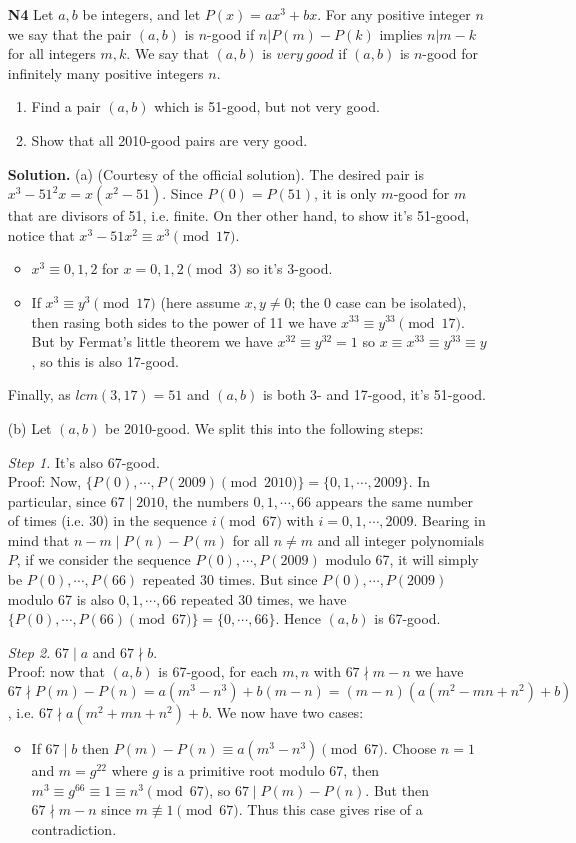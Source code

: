 \documentclass[11pt]{article}
\newcommand{\<}{\langle}
\renewcommand{\>}{\rangle}
\begin{document}
\begin{enumerate}
	\item [\textbf{N4}]Let $a, b$ be integers, and let $P(x) = ax^3+bx.$ For any positive integer $n$ we say that the pair $(a,b)$ is $n$-good if $n | P(m)-P(k)$ implies $n | m - k$ for all integers $m, k.$ We say that $(a,b)$ is $very \ good$ if $(a,b)$ is $n$-good for infinitely many positive integers $n.$
	\begin{enumerate}
		\item Find a pair $(a,b)$ which is 51-good, but not very good.
		\item Show that all 2010-good pairs are very good.
		\end{enumerate}
	
	\textbf{Solution.} 
	(a) (Courtesy of the official solution). The desired pair is $x^3-51^2x=x(x^2-51)$. Since $P(0)=P(51)$, it is only $m$-good for $m$ that are divisors of 51, i.e. finite. 
	On ther other hand, to show it's 51-good, notice that $x^3-51x^2\equiv x^3\pmod{17}$. 
	\begin{itemize}
		\item $x^3\equiv 0, 1, 2$ for $x=0, 1, 2\pmod{3}$ so it's 3-good. 
		\item If $x^3\equiv y^3\pmod{17}$ (here assume $x, y\neq 0$; the 0 case can be isolated), then rasing both sides to the power of 11 we have $x^{33}\equiv y^{33}\pmod{17}$. But by Fermat's little theorem we have $x^{32}\equiv y^{32}=1$ so $x\equiv x^{33}\equiv y^{33}\equiv y$, so this is also 17-good. 
	\end{itemize}
	Finally, as $lcm(3, 17)=51$ and $(a, b)$ is both 3- and 17-good, it's 51-good. 
	
	(b) Let $(a, b)$ be 2010-good. We split this into the following steps: 
	
	\emph{Step 1.} It's also 67-good. \\
	Proof: Now, $\{P(0), \cdots , P(2009) \pmod{2010}\}=\{0, 1, \cdots , 2009\}$. In particular, since $67\mid 2010$, the numbers $0, 1, \cdots , 66$ appears the same number of times (i.e. 30) in the sequence $i\pmod{67}$ with $i=0, 1, \cdots , 2009$. 
	Bearing in mind that $n-m\mid P(n)-P(m)$ for all $n\neq m$ and all integer polynomials $P$, if we consider the sequence $P(0), \cdots , P(2009)$ modulo 67, it will simply be $P(0), \cdots , P(66)$ repeated 30 times. But since $P(0), \cdots , P(2009)$ modulo 67 is also $0, 1, \cdots , 66$ repeated 30 times, we have $\{P(0), \cdots , P(66)\pmod{67}\}=\{0, \cdots, 66\}$. Hence $(a, b)$ is 67-good. 
	
	\emph{Step 2.} $67\mid a$ and $67\nmid b$. \\
	Proof: now that $(a, b)$ is 67-good, for each $m, n$ with $67\nmid m-n$ we have $67\nmid P(m)-P(n)=a(m^3-n^3)+b(m-n)=(m-n)(a(m^2-mn+n^2)+b)$, i.e. $67\nmid a(m^2+mn+n^2)+b$. We now have two cases: 
	\begin{itemize}
		\item If $67\mid b$ then $P(m)-P(n)\equiv a(m^3-n^3)\pmod{67}$. Choose $n=1$ and $m=g^{22}$ where $g$ is a primitive root modulo 67, then $m^3\equiv g^{66}\equiv 1\equiv n^3\pmod{67}$, so $67\mid P(m)-P(n)$. But then $67\nmid m-n$ since $m\not\equiv 1\pmod{67}$. Thus this case gives rise of a contradiction. 
		

\end{itemize}
\end{enumerate}
\end{document}
